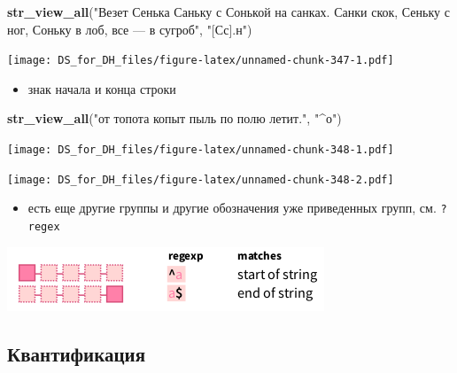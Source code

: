 \documentclass[
]{book}
\newenvironment{Shaded}{\begin{snugshade}}{\end{snugshade}}
\newcommand{\KeywordTok}[1]{\textcolor[rgb]{0.13,0.29,0.53}{\textbf{#1}}}
\newcommand{\NormalTok}[1]{#1}
\newcommand{\StringTok}[1]{\textcolor[rgb]{0.31,0.60,0.02}{#1}}
\providecommand{\tightlist}{%
  \setlength{\itemsep}{0pt}\setlength{\parskip}{0pt}}
\begin{document}
\begin{Shaded}
\begin{Highlighting}[]
\KeywordTok{str_view_all}\NormalTok{(}\StringTok{"Везет Сенька Саньку с Сонькой на санках. Санки скок, Сеньку с ног, Соньку в лоб, все — в сугроб"}\NormalTok{, }\StringTok{"[Сс].н"}\NormalTok{)}
\end{Highlighting}
\end{Shaded}

\texttt{[image: DS\_for\_DH\_files/figure-latex/unnamed-chunk-347-1.pdf]}

\begin{itemize}
\tightlist
\item
  знак начала и конца строки
\end{itemize}

\begin{Shaded}
\begin{Highlighting}[]
\KeywordTok{str_view_all}\NormalTok{(}\StringTok{"от топота копыт пыль по полю летит."}\NormalTok{, }\StringTok{"^о"}\NormalTok{)}
\end{Highlighting}
\end{Shaded}

\texttt{[image: DS\_for\_DH\_files/figure-latex/unnamed-chunk-348-1.pdf]}

\begin{Shaded}
\end{Shaded}

\texttt{[image: DS\_for\_DH\_files/figure-latex/unnamed-chunk-348-2.pdf]}

\begin{itemize}
\tightlist
\item
  есть еще другие группы и другие обозначения уже приведенных групп, см. \texttt{?regex}
\end{itemize}

\includegraphics{images/5.14_anchors.png}

\hypertarget{ux43aux432ux430ux43dux442ux438ux444ux438ux43aux430ux446ux438ux44f}{%
\subsection{Квантификация}\label{ux43aux432ux430ux43dux442ux438ux444ux438ux43aux430ux446ux438ux44f}}
\end{document}
